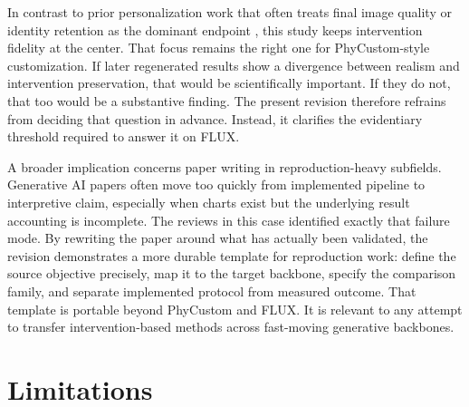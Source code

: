 \documentclass{article}
\begin{document}
In contrast to prior personalization work that often treats final image quality or identity retention as the dominant endpoint \cite{ruiz2023dreambooth}, this study keeps intervention fidelity at the center. That focus remains the right one for PhyCustom-style customization. If later regenerated results show a divergence between realism and intervention preservation, that would be scientifically important. If they do not, that too would be a substantive finding. The present revision therefore refrains from deciding that question in advance. Instead, it clarifies the evidentiary threshold required to answer it on FLUX.

A broader implication concerns paper writing in reproduction-heavy subfields. Generative AI papers often move too quickly from implemented pipeline to interpretive claim, especially when charts exist but the underlying result accounting is incomplete. The reviews in this case identified exactly that failure mode. By rewriting the paper around what has actually been validated, the revision demonstrates a more durable template for reproduction work: define the source objective precisely, map it to the target backbone, specify the comparison family, and separate implemented protocol from measured outcome. That template is portable beyond PhyCustom and FLUX. It is relevant to any attempt to transfer intervention-based methods across fast-moving generative backbones.

\section{Limitations}
\end{document}
